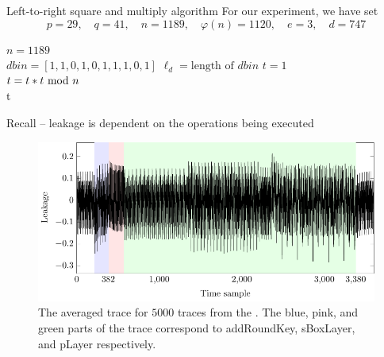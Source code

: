 \begin{frame}{Left-to-right square and multiply algorithm}
For our experiment, we have set
        \[
        p=29,\quad q=41,\quad n=1189,\quad \varphi(n)=1120,\quad e=3,\quad d=747
        \]
{\small
\begin{algorithm}[H]
$n=1189$\\
$dbin=[1,1,0,1,0,1,1,1,0,1]$
$\ell_d=\text{length of }dbin$
$t = 1$\\
 	{
  	$t=t*t\textrm{~mod~} n$\\
  	}
  	\Return t
\caption{Left-to-right square and multiply algorithm for computing modular exponentiation with parameters from above.}
\end{algorithm}}
\end{frame}

\begin{frame}{Recall -- leakage is dependent on the operations being executed}
    \begin{figure}
    \centering
\includegraphics{fig/PRESENT_plot___one_round_average___highlighted_operations.pdf}
    \caption{The averaged trace for $5000$ traces from the \datafixone.
    The blue, pink, and green parts of the trace correspond to addRoundKey, sBoxLayer, and pLayer respectively.}
\end{figure}
\end{frame}

